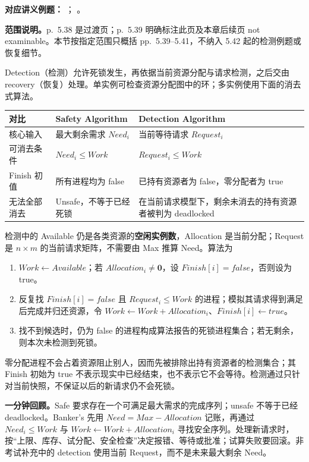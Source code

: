 \textbf{对应讲义例题：}
；
。


\textbf{范围说明。}p.~5.38 是过渡页；p.~5.39 明确标注此页及本章后续页 not examinable。本节按指定范围只概括 pp.~5.39--5.41，不纳入 5.42 起的检测例题或恢复细节。

Detection（检测）允许死锁发生，再依据当前资源分配与请求检测，之后交由 recovery（恢复）处理。单实例可检查资源分配图中的环；多实例使用下面的消去式算法。

\begin{center}
\begin{tabularx}{\textwidth}{@{}lXX@{}}
  \toprule
  对比 & Safety Algorithm & Detection Algorithm \\
  \midrule
  核心输入 & 最大剩余需求 $Need_i$ & 当前等待请求 $Request_i$ \\
  可消去条件 & $Need_i\le Work$ & $Request_i\le Work$ \\
  Finish 初值 & 所有进程均为 false & 已持有资源者为 false，零分配者为 true \\
  无法全部消去 & Unsafe，不等于已经死锁 & 在当前请求模型下，剩余未消去的持有资源者被判为 deadlocked \\
  \bottomrule
\end{tabularx}
\end{center}

检测中的 Available 仍是各类资源的\textbf{空闲实例数}，Allocation 是当前分配；Request 是 $n\times m$ 的当前请求矩阵，不需要由 Max 推算 Need。算法为
\begin{enumerate}
  \item $Work\leftarrow Available$；若 $Allocation_i\ne\mathbf0$，设 $Finish[i]=false$，否则设为 true。
  \item 反复找 $Finish[i]=false$ 且 $Request_i\le Work$ 的进程；模拟其请求得到满足后完成并归还资源，令 $Work\leftarrow Work+Allocation_i$、$Finish[i]\leftarrow true$。
  \item 找不到候选时，仍为 false 的进程构成算法报告的死锁进程集合；若无剩余，则本次未检测到死锁。
\end{enumerate}
零分配进程不会占着资源阻止别人，因而先被排除出持有资源者的检测集合；其 Finish 初始为 true 不表示现实中已经结束，也不表示它不会等待。检测通过只针对当前快照，不保证以后的新请求仍不会死锁。

\textbf{一分钟回顾。}Safe 要求存在一个可满足最大需求的完成序列；unsafe 不等于已经 deadlocked。Banker's 先用 $Need=Max-Allocation$ 记账，再通过 $Need_i\le Work$ 与 $Work\leftarrow Work+Allocation_i$ 寻找安全序列。处理新请求时，按“上限、库存、试分配、安全检查”决定报错、等待或批准；试算失败要回滚。非考试补充中的 detection 使用当前 Request，而不是未来最大剩余 Need。
